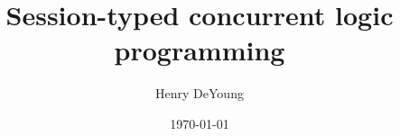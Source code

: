 \documentclass{beamer}
\title{Session-typed concurrent logic programming}
\author[DeYoung]{Henry DeYoung}
\institute[Carnegie Mellon]{%
  Computer Science Department\\Carnegie Mellon University}
\date{\today}
\begin{document}
\begin{frame}
  \titlepage
\end{frame}




\begin{frame}
  
\end{frame}


\begin{frame}
  
\end{frame}


\begin{frame}
  
\end{frame}


\begin{frame}[plain]
  
\end{frame}


\begin{frame}
  
\end{frame}


\begin{frame}
  
\end{frame}


\begin{frame}
  
\end{frame}


\begin{frame}
  
\end{frame}


\begin{frame}
  
\end{frame}

\begin{frame}
  
\end{frame}


\begin{frame}[plain]
  
\end{frame}
\end{document}
